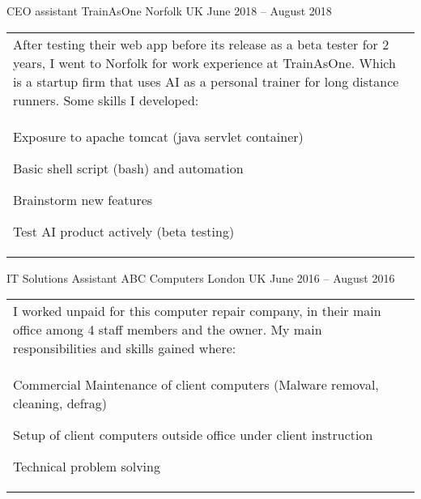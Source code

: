 \documentclass[]{awesome-cv}
\begin{document}
\vspace{-2mm}
\begin{cventries}
	\cventry
	{CEO assistant}
	{TrainAsOne}
	{Norfolk UK}
	{June 2018 – August 2018}
    {{\begin{tabular}{p{}}
        After testing their web app before its release as a beta tester for 2 years, I went to Norfolk for work experience at TrainAsOne. Which is a startup firm that uses AI as a personal trainer for long distance runners. Some skills I developed:   \\
        \begin{cvitems}
            \item {Exposure to apache tomcat (java servlet container)}
            \item {Basic shell script (bash) and automation}
            \item {Brainstorm new features}
            \item {Test AI product actively (beta testing)}
        \end{cvitems}
    \end{tabular}}
    }

	\cventry
	{IT Solutions Assistant}
	{ABC Computers}
	{London UK}
	{June 2016 – August 2016}
    {{\begin{tabular}{p{}}
        I worked unpaid for this computer repair company, in their main office among 4 staff members and the owner. My main responsibilities and skills gained where:   \\
	    \begin{cvitems}
            \item {Commercial Maintenance of client computers (Malware removal, cleaning, defrag)}
            \item {Setup of client computers outside office under client instruction}
            \item {Technical problem solving}
		\end{cvitems}
    \end{tabular}}
    }
\end{cventries}
\end{document}
